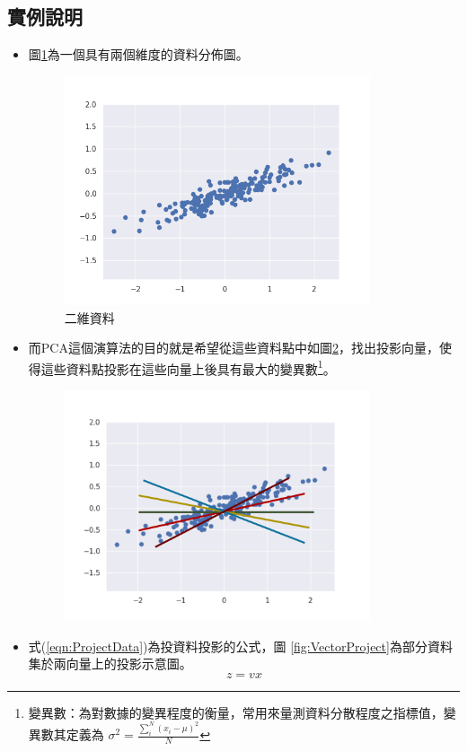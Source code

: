 \subsection{實例說明}

\begin{itemize}
	\item
	      圖\ref{fig:PcaDemostrate}為一個具有兩個維度的資料分佈圖。


	      \begin{figure}[h]
		      \centering
		      \includegraphics[width=9cm]{pic/pca_demostrate.png}
		      \caption{二維資料}
		      \label{fig:PcaDemostrate}
	      \end{figure}


	\newpage
	\item
	      而PCA這個演算法的目的就是希望從這些資料點中如圖\ref{fig:PcaVectorToFind}，找出投影向量，使得這些資料點投影在這些向量上後具有最大的變異數\footnote{\noindent 變異數：為對數據的變異程度的衡量，常用來量測資料分散程度之指標值，變異數其定義為 \(\sigma^2=\frac{{}\sum^{N}_{i}(x_i-\mu )^2}{N}\) }。
	      \begin{figure}[h]
		      \centering
		      \includegraphics[width=9cm]{./pic/iVu9zQYG.png}
		      \caption{}
		      \label{fig:PcaVectorToFind}
	      \end{figure}
	\item
		式(\ref{eqn:ProjectData})為投資料投影的公式，圖 \ref{fig:VectorProject}為部分資料集於兩向量上的投影示意圖。 
		\begin{equation}
			\label{eqn:ProjectData}
			 z = vx
		\end{equation}



\end{itemize}
